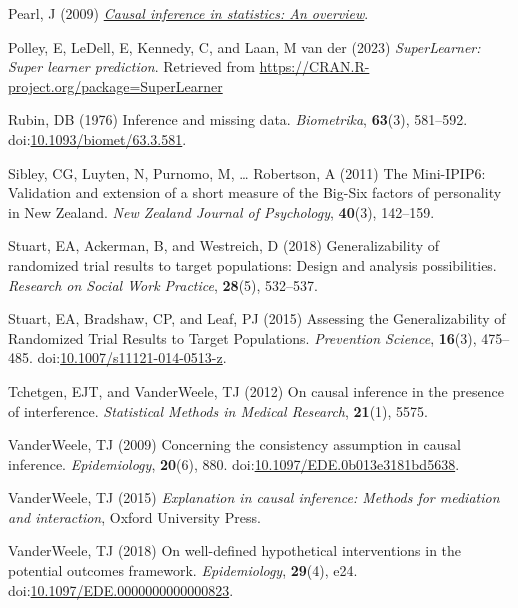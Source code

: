 \documentclass[
  singlecolumn]{article}
\newlength{\cslhangindent}
\newenvironment{CSLReferences}[2] %
 {\begin{list}{}{%
  \setlength{\itemindent}{0pt}
  \setlength{\leftmargin}{0pt}
  \setlength{\parsep}{0pt}
  \ifodd #1
   \setlength{\leftmargin}{\cslhangindent}
   \setlength{\itemindent}{-1\cslhangindent}
  \fi
  \setlength{\itemsep}{#2\baselineskip}}}
 {\end{list}}
\begin{document}
\begin{CSLReferences}{1}{0}
Pearl, J (2009) \emph{\href{https://doi.org/10.1214/09-SS057}{Causal
inference in statistics: An overview}}.

Polley, E, LeDell, E, Kennedy, C, and Laan, M van der (2023)
\emph{SuperLearner: Super learner prediction}. Retrieved from
\url{https://CRAN.R-project.org/package=SuperLearner}

Rubin, DB (1976) Inference and missing data. \emph{Biometrika},
\textbf{63}(3), 581--592.
doi:\href{https://doi.org/10.1093/biomet/63.3.581}{10.1093/biomet/63.3.581}.

Sibley, CG, Luyten, N, Purnomo, M, \ldots{} Robertson, A (2011) The
Mini-IPIP6: Validation and extension of a short measure of the Big-Six
factors of personality in New Zealand. \emph{New Zealand Journal of
Psychology}, \textbf{40}(3), 142--159.

Stuart, EA, Ackerman, B, and Westreich, D (2018) Generalizability of
randomized trial results to target populations: Design and analysis
possibilities. \emph{Research on Social Work Practice}, \textbf{28}(5),
532--537.

Stuart, EA, Bradshaw, CP, and Leaf, PJ (2015) Assessing the
Generalizability of Randomized Trial Results to Target Populations.
\emph{Prevention Science}, \textbf{16}(3), 475--485.
doi:\href{https://doi.org/10.1007/s11121-014-0513-z}{10.1007/s11121-014-0513-z}.

Tchetgen, EJT, and VanderWeele, TJ (2012) On causal inference in the
presence of interference. \emph{Statistical Methods in Medical
Research}, \textbf{21}(1), 5575.

VanderWeele, TJ (2009) Concerning the consistency assumption in causal
inference. \emph{Epidemiology}, \textbf{20}(6), 880.
doi:\href{https://doi.org/10.1097/EDE.0b013e3181bd5638}{10.1097/EDE.0b013e3181bd5638}.

VanderWeele, TJ (2015) \emph{Explanation in causal inference: Methods
for mediation and interaction}, Oxford University Press.

VanderWeele, TJ (2018) On well-defined hypothetical interventions in the
potential outcomes framework. \emph{Epidemiology}, \textbf{29}(4), e24.
doi:\href{https://doi.org/10.1097/EDE.0000000000000823}{10.1097/EDE.0000000000000823}.


\end{CSLReferences}
\end{document}
